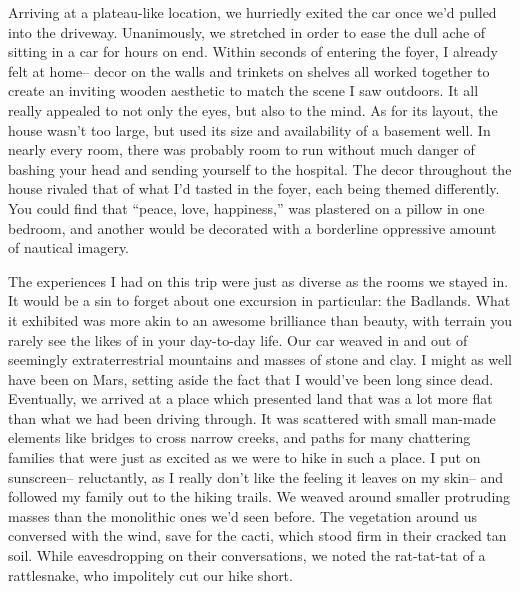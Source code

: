 \documentclass[12pt]{article}
\begin{document}
Arriving at a plateau-like location, we hurriedly exited the car once we'd pulled into the driveway.  Unanimously, we stretched in order to ease the dull ache of sitting in a car for hours on end.  Within seconds of entering the foyer, I already felt at home--  decor on the walls and trinkets on shelves all worked together to create an inviting wooden aesthetic to match the scene I saw outdoors.  It all really appealed to not only the eyes, but also to the mind.  As for its layout, the house wasn't too large, but used its size and availability of a basement well.  In nearly every room, there was probably room to run without much danger of bashing your head and sending yourself to the hospital.  The decor throughout the house rivaled that of what I'd tasted in the foyer, each being themed differently.  You could find that ``peace, love, happiness,'' was plastered on a pillow in one bedroom, and another would be decorated with a borderline oppressive amount of nautical imagery.

The experiences I had on this trip were just as diverse as the rooms we stayed in.  It would be a sin to forget about one excursion in particular:  the Badlands.  What it exhibited was more akin to an awesome brilliance than beauty, with terrain you rarely see the likes of in your day-to-day life.  Our car weaved in and out of seemingly extraterrestrial mountains and masses of stone and clay.  I might as well have been on Mars, setting aside the fact that I would've been long since dead.  Eventually, we arrived at a place which presented land that was a lot more flat than what we had been driving through.  It was scattered with small man-made elements like bridges to cross narrow creeks, and paths for many chattering families that were just as excited as we were to hike in such a place.  I put on sunscreen-- reluctantly, as I really don't like the feeling it leaves on my skin-- and followed my family out to the hiking trails.  We weaved around smaller protruding masses than the monolithic ones we'd seen before.  The vegetation around us conversed with the wind, save for the cacti, which stood firm in their cracked tan soil.  While eavesdropping on their conversations, we noted the rat-tat-tat of a rattlesnake, who impolitely cut our hike short. 
\end{document}
